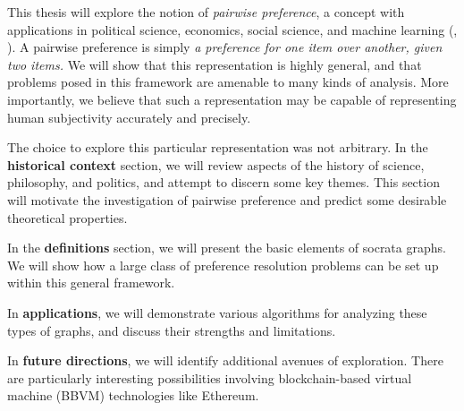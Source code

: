 This thesis will explore the notion of \textit{pairwise preference}, a concept with applications in political science, economics, social science, and machine learning (\cite{jordan}, \cite{arrow}).
A pairwise preference is simply \textit{a preference for one item over another, given two items.}
We will show that this representation is highly general, and that problems posed in this framework are amenable to many kinds of analysis.
More importantly, we believe that such a representation may be capable of representing human subjectivity accurately and precisely.

\bigskip

The choice to explore this particular representation was not arbitrary.
In the \textbf{historical context} section, we will review aspects of the history of science, philosophy, and politics, and attempt to discern some key themes.
This section will motivate the investigation of pairwise preference and predict some desirable theoretical properties.

In the \textbf{definitions} section, we will present the basic elements of socrata graphs.
We will show how a large class of preference resolution problems can be set up within this general framework.

In \textbf{applications}, we will demonstrate various algorithms for analyzing these types of graphs, and discuss their strengths and limitations.

In \textbf{future directions}, we will identify additional avenues of exploration. There are particularly interesting possibilities involving blockchain-based virtual machine (BBVM) technologies like Ethereum.